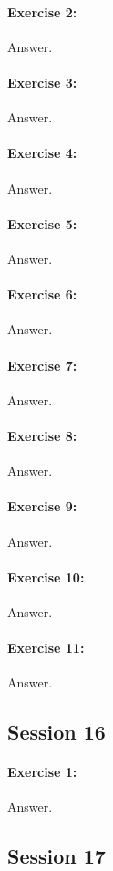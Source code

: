\documentclass{article}
\begin{document}
\paragraph{Exercise 2:}
Answer.
\paragraph{Exercise 3:}
Answer.
\paragraph{Exercise 4:}
Answer.
\paragraph{Exercise 5:}
Answer.
\paragraph{Exercise 6:}
Answer.
\paragraph{Exercise 7:}
Answer.
\paragraph{Exercise 8:}
Answer.
\paragraph{Exercise 9:}
Answer.
\paragraph{Exercise 10:}
Answer.
\paragraph{Exercise 11:}
Answer.
\newpage

\subsection*{Session 16}
\paragraph{Exercise 1:}
Answer.
\newpage

\subsection*{Session 17}
\end{document}
